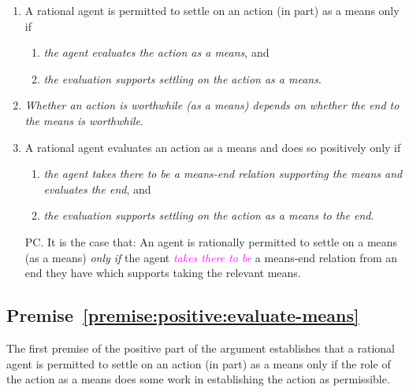 \documentclass[10pt]{article}
\newcommand{\hozlinedash}[0]{%
  \noindent\hdashrule[0.5ex][c]{\textwidth}{.1pt}{2.5pt}
}
\begin{document}
\begin{enumerate}[label=P\arabic*., ref=(P\arabic*)]
\item\label{premise:positive:evaluate-means} A rational agent is permitted to settle on an action (in part) as a means only if
  \begin{enumerate}[label=P\arabic{enumi}\alph*., ref=(P\arabic{enumi}\alph*)]
  \item \emph{the agent evaluates the action as a means}, and
  \item \emph{the evaluation supports settling on the action as a means}.
  \end{enumerate}
\item\label{premise:positive:principle-dependency} \emph{Whether an action is worthwhile (as a means) depends on whether the end to the means is worthwhile}.
\item\label{premise:positive:evaluate-end} A rational agent evaluates an action as a means and does so positively only if
  \begin{enumerate}[label=P\arabic{enumi}\alph*., ref=(P\arabic{enumi}\alph*)]
  \item \emph{the agent takes there to be a means-end relation supporting the means and evaluates the end}, and
  \item \emph{the evaluation supports settling on the action as a means to the end}.
  \end{enumerate}
\end{enumerate}

\begin{enumerate}[label=P\arabic*., ref=(P\arabic*), resume]
\item[PC.] It is the case that:
  An agent is rationally permitted to settle on a means (as a means)  \emph{only if} the agent \textcolor{fuchsia}{\emph{takes there to be}} a means-end relation from an end they have which supports taking the relevant means.
\end{enumerate}

\hozlinedash

\subsection{Premise~\ref{premise:positive:evaluate-means}}
\label{sec:premise-1}

The first premise of the positive part of the argument establishes that a rational agent is permitted to settle on an action (in part) as a means only if the role of the action as a means does some work in establishing the action as permissible.
\end{document}
